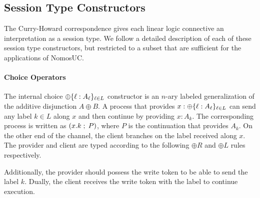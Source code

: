 \subsection{Session Type Constructors}
\label{subsec:constructors}

The Curry-Howard correspondence gives each linear logic connective an
interpretation as a session type.
We follow a detailed description of each of these session type constructors,
but restricted to a subset that are sufficient for the applications of NomosUC.

\paragraph*{\textbf{Choice Operators}}
The internal choice $\oplus \{ \ell : A_\ell \}_{\ell \in L}$ constructor
is an $n$-ary labeled generalization of the additive disjunction $A \oplus B$.
A process that provides $x : \oplus \{ \ell : A_\ell \}_{\ell \in L}$ can send
any label $k \in L$ along $x$ and then continue by providing $x : A_k$. The
corresponding process is written as $(x.k \; ; \; P)$, where
$P$ is the continuation that provides $A_k$.
On the other end of the channel, the client branches on the label received along $x$.
The provider and client are typed according to the following $\oplus R$ and $\oplus L$
rules respectively.
Additionally, the provider should possess the write token to be able to send the
label $k$. Dually, the client receives the write token with the label to continue
execution.

